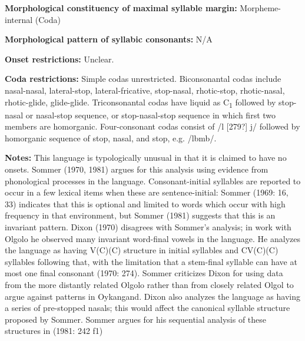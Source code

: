 \begin{styleBody}
\textbf{Morphological constituency of maximal syllable margin:} Morpheme-internal (Coda)
\end{styleBody}

\begin{styleBody}
\textbf{Morphological pattern of syllabic consonants:} N/A
\end{styleBody}

\begin{styleBody}
\textbf{Onset restrictions:} Unclear.
\end{styleBody}

\begin{styleBody}
\textbf{Coda restrictions: }Simple codas unrestricted. Biconsonantal codas include nasal-nasal, lateral-stop, lateral-fricative, stop-nasal, rhotic-stop, rhotic-nasal, rhotic-glide, glide-glide. Triconsonantal codas have liquid as C\textsubscript{1} followed by stop-nasal or nasal-stop sequence, or stop-nasal-stop sequence in which first two members are homorganic. Four-consonant codas consist of /l [279?] j/ followed by homorganic sequence of stop, nasal, and stop, e.g. /lbmb/.
\end{styleBody}

\begin{styleBody}
\textbf{Notes: }This language is typologically unusual in that it is claimed to have no onsets. Sommer (1970, 1981) argues for this analysis using evidence from phonological processes in the language. Consonant-initial syllables are reported to occur in a few lexical items when these are sentence-initial: Sommer (1969: 16, 33) indicates that this is optional and limited to words which occur with high frequency in that environment, but Sommer (1981) suggests that this is an invariant pattern. Dixon (1970) disagrees with Sommer’s analysis; in work with Olgolo he observed many invariant word-final vowels in the language. He analyzes the language as having V(C)(C) structure in initial syllables and CV(C)(C) syllables following that, with the limitation that a stem-final syllable can have at most one final consonant (1970: 274). Sommer criticizes Dixon for using data from the more distantly related Olgolo rather than from closely related Olgol to argue against patterns in Oykangand. Dixon also analyzes the language as having a series of pre-stopped nasals; this would affect the canonical syllable structure proposed by Sommer. Sommer argues for his sequential analysis of these structures in (1981: 242 f1)
\end{styleBody}

